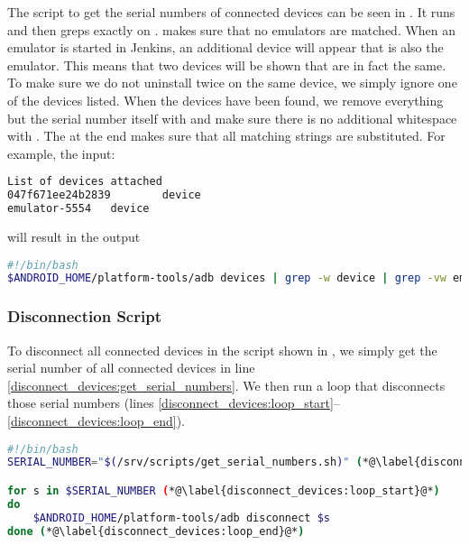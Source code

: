 The script to get the serial numbers of connected devices can be seen in . It runs  and then {grep}s exactly on .  makes sure that no emulators are matched. When an emulator is started in Jenkins, an additional device will appear that is also the emulator. This means that two devices will be shown that are in fact the same. To make sure we do not uninstall twice on the same device, we simply ignore one of the devices listed. When the devices have been found, we remove everything but the serial number itself with  and make sure there is no additional whitespace with . The  at the end makes sure that all matching strings are substituted. For example, the input:
\begin{lstlisting}[language=bash]
List of devices attached
047f671ee24b2839        device
emulator-5554   device
\end{lstlisting}
will result in the output 

\begin{lstlisting}[float=tbp,language=bash,caption=Bash script that gets the serial numbers of all connected devices,label=lst:get_serial_numbers]
#!/bin/bash
$ANDROID_HOME/platform-tools/adb devices | grep -w device | grep -vw emulator | sed 's/\s*device//' | sed 's/\s*//g'
\end{lstlisting}
\subsubsection{Disconnection Script}
To disconnect all connected devices in the script shown in , we simply get the serial number of all connected devices in line \ref{disconnect_devices:get_serial_numbers}. We then run a loop that disconnects those serial numbers (lines \ref{disconnect_devices:loop_start}--\ref{disconnect_devices:loop_end}).
\begin{lstlisting}[float=tbp,language=bash,caption=Bash script that disconnects all connected devices,label=lst:disconnect_devices]
#!/bin/bash
SERIAL_NUMBER="$(/srv/scripts/get_serial_numbers.sh)" (*@\label{disconnect_devices:get_serial_numbers}@*)

for s in $SERIAL_NUMBER (*@\label{disconnect_devices:loop_start}@*)
do
    $ANDROID_HOME/platform-tools/adb disconnect $s
done (*@\label{disconnect_devices:loop_end}@*)
\end{lstlisting}

